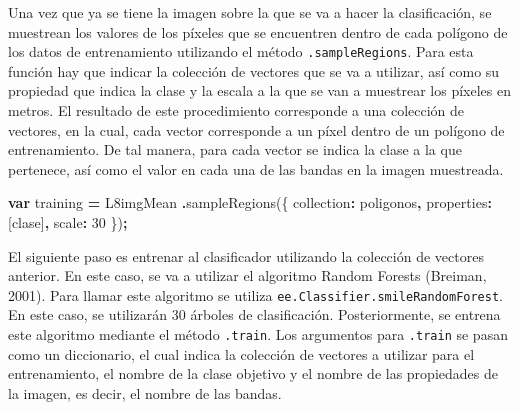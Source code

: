 \documentclass[
  12pt,
  letterpaper,
  twoside]{book}
\newenvironment{Shaded}{\begin{snugshade}}{\end{snugshade}}
\newcommand{\DataTypeTok}[1]{\textcolor[rgb]{0.13,0.29,0.53}{#1}}
\newcommand{\DecValTok}[1]{\textcolor[rgb]{0.00,0.00,0.81}{#1}}
\newcommand{\FunctionTok}[1]{\textcolor[rgb]{0.00,0.00,0.00}{#1}}
\newcommand{\KeywordTok}[1]{\textcolor[rgb]{0.13,0.29,0.53}{\textbf{#1}}}
\newcommand{\NormalTok}[1]{#1}
\newcommand{\OperatorTok}[1]{\textcolor[rgb]{0.81,0.36,0.00}{\textbf{#1}}}
\newcommand{\StringTok}[1]{\textcolor[rgb]{0.31,0.60,0.02}{#1}}
\begin{document}
Una vez que ya se tiene la imagen sobre la que se va a hacer la clasificación, se muestrean los valores de los píxeles que se encuentren dentro de cada polígono de los datos de entrenamiento utilizando el método \texttt{.sampleRegions}. Para esta función hay que indicar la colección de vectores que se va a utilizar, así como su propiedad que indica la clase y la escala a la que se van a muestrear los píxeles en metros. El resultado de este procedimiento corresponde a una colección de vectores, en la cual, cada vector corresponde a un píxel dentro de un polígono de entrenamiento. De tal manera, para cada vector se indica la clase a la que pertenece, así como el valor en cada una de las bandas en la imagen muestreada.

\begin{Shaded}
\begin{Highlighting}[]
\KeywordTok{var}\NormalTok{ training }\OperatorTok{=}\NormalTok{ L8imgMean}
  \OperatorTok{.}\FunctionTok{sampleRegions}\NormalTok{(\{}
    \DataTypeTok{collection}\OperatorTok{:}\NormalTok{ poligonos}\OperatorTok{,}
    \DataTypeTok{properties}\OperatorTok{:}\NormalTok{ [}\StringTok{\textquotesingle{}clase\textquotesingle{}}\NormalTok{]}\OperatorTok{,}
    \DataTypeTok{scale}\OperatorTok{:} \DecValTok{30}
\NormalTok{  \})}\OperatorTok{;}
\end{Highlighting}
\end{Shaded}

El siguiente paso es entrenar al clasificador utilizando la colección de vectores anterior. En este caso, se va a utilizar el algoritmo Random Forests (Breiman, 2001). Para llamar este algoritmo se utiliza \texttt{ee.Classifier.smileRandomForest}. En este caso, se utilizarán 30 árboles de clasificación. Posteriormente, se entrena este algoritmo mediante el método \texttt{.train}. Los argumentos para \texttt{.train} se pasan como un diccionario, el cual indica la colección de vectores a utilizar para el entrenamiento, el nombre de la clase objetivo y el nombre de las propiedades de la imagen, es decir, el nombre de las bandas.
\end{document}
